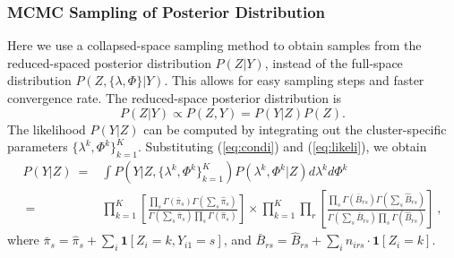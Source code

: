 \subsubsection{MCMC Sampling of Posterior Distribution}
Here we use a collapsed-space sampling method \cite{neal2000markov,collapsed_escobar} to obtain samples from the reduced-spaced posterior distribution $P(Z|Y)$, instead of the full-space distribution $P(Z, \{\lambda, \Phi\} | Y)$. This allows for easy sampling steps and faster convergence rate. 
The reduced-space posterior distribution is
\begin{equation*}
 P(Z|Y) \propto P(Z, Y) = P(Y|Z) P(Z).
\end{equation*}
The likelihood $P(Y|Z)$ can be computed by integrating out the cluster-specific parameters $\{\lambda^k, \Phi^k\}_{k=1}^K$.
Substituting  (\ref{eq:condi}) and (\ref{eq:likeli}), we obtain
\begin{equation*}
\renewcommand*{\arraystretch}{1.9}
\begin{array}{rl}
     P(Y|Z) 
~ = & \int  P(Y| Z, \{\lambda^k, \Phi^k \}_{k=1}^K) P(\lambda^k, \Phi^k | Z) d\lambda^k d\Phi^{k} \\
~ = & \displaystyle{ \prod_{k=1}^K 
      \left[ 
      \frac{\prod_s \Gamma(\bar \pi_s) \Gamma (\sum_s \hat \pi_s)}
           {\Gamma\left( \sum_s \bar \pi_s \right) \prod_s \Gamma (\hat \pi_s)}
      \right]  } \times
    \displaystyle{ \prod_{k=1}^K \prod_r 
      \left[ 
      \frac{\prod_s \Gamma(\bar B_{rs}) \Gamma (\sum_s \hat B_{rs})}
           {\Gamma\left( \sum_s \bar  B_{rs} \right) \prod_s \Gamma (\hat B_{rs})}
      \right] } ~,
\end{array}
\end{equation*}
where
$\bar \pi _s = \hat \pi_s + \sum_{i} \mathbf{1}[Z_i=k,Y_{i1} = s]$, and
$\bar B_{rs} = \hat B_{rs} + \sum_{i} n_{irs}  \cdot \mathbf{1}[Z_i=k]$.

